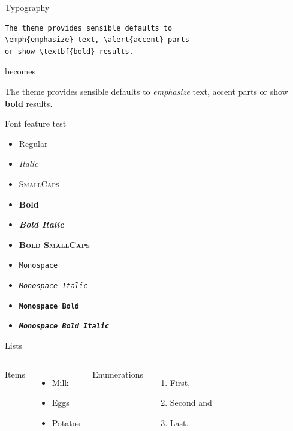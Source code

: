 \documentclass[10pt,xcolor={dvipsnames,svgnames,x11names}]{beamer}
\begin{document}
\begin{frame}[fragile]{Typography}
      \begin{verbatim}The theme provides sensible defaults to
\emph{emphasize} text, \alert{accent} parts
or show \textbf{bold} results.\end{verbatim}

  \begin{center}becomes\end{center}

  The theme provides sensible defaults to \emph{emphasize} text,
  \alert{accent} parts or show \textbf{bold} results.
\end{frame}

\begin{frame}{Font feature test}
  \begin{itemize}
    \item Regular
    \item \textit{Italic}
    \item \textsc{SmallCaps}
    \item \textbf{Bold}
    \item \textbf{\textit{Bold Italic}}
    \item \textbf{\textsc{Bold SmallCaps}}
    \item \texttt{Monospace}
    \item \texttt{\textit{Monospace Italic}}
    \item \texttt{\textbf{Monospace Bold}}
    \item \texttt{\textbf{\textit{Monospace Bold Italic}}}
  \end{itemize}
\end{frame}

\begin{frame}{Lists}
  \begin{columns}[T,onlytextwidth]
      Items
      \begin{itemize}
        \item Milk 
        \item Eggs 
        \item Potatos
      \end{itemize}

      Enumerations
      \begin{enumerate}
        \item First, 
        \item Second and 
        \item Last.
      \end{enumerate}
  \end{columns}
\end{frame}
\end{document}
